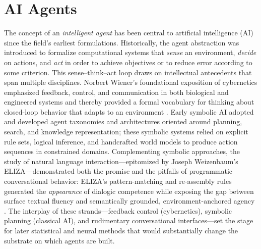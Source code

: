\section{AI Agents}
\label{ch2:sec4}

The concept of an \emph{intelligent agent} has been central to artificial intelligence (AI) since the field's earliest formulations.  Historically, the agent abstraction was introduced to formalize computational systems that \emph{sense} an environment, \emph{decide} on actions, and \emph{act} in order to achieve objectives or to reduce error according to some criterion.  This sense--think--act loop draws on intellectual antecedents that span multiple disciplines.  Norbert Wiener's foundational exposition of cybernetics emphasized feedback, control, and communication in both biological and engineered systems and thereby provided a formal vocabulary for thinking about closed-loop behavior that adapts to an environment \cite{wiener48}.  Early symbolic AI adopted and developed agent taxonomies and architectures oriented around planning, search, and knowledge representation; these symbolic systems relied on explicit rule sets, logical inference, and handcrafted world models to produce action sequences in constrained domains.  Complementing symbolic approaches, the study of natural language interaction—epitomized by Joseph Weizenbaum's ELIZA—demonstrated both the promise and the pitfalls of programmatic conversational behavior: ELIZA's pattern-matching and re-assembly rules generated the \emph{appearance} of dialogic competence while exposing the gap between surface textual fluency and semantically grounded, environment-anchored agency \cite{weizenbaum66}.  The interplay of these strands—feedback control (cybernetics), symbolic planning (classical AI), and rudimentary conversational interfaces—set the stage for later statistical and neural methods that would substantially change the substrate on which agents are built.

